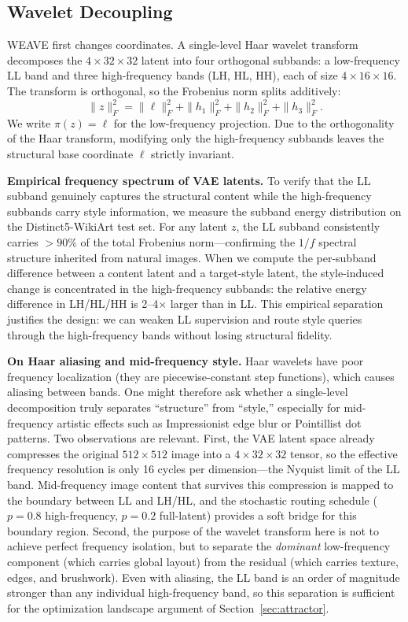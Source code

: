 \documentclass[letterpaper]{article}
\begin{document}
\subsection{Wavelet Decoupling}
\label{sec:fiberbundle}

WEAVE first changes coordinates.
A single-level Haar wavelet transform decomposes the $4{\times}32{\times}32$ latent into four orthogonal subbands: a low-frequency LL band and three high-frequency bands (LH, HL, HH), each of size $4{\times}16{\times}16$.
The transform is orthogonal, so the Frobenius norm splits additively:
\begin{equation}
\|z\|_F^2 = \|\ell\|_F^2 + \|h_1\|_F^2 + \|h_2\|_F^2 + \|h_3\|_F^2.
\end{equation}
We write $\pi(z)=\ell$ for the low-frequency projection.
Due to the orthogonality of the Haar transform, modifying only the high-frequency subbands leaves the structural base coordinate $\ell$ strictly invariant.

\textbf{Empirical frequency spectrum of VAE latents.}
To verify that the LL subband genuinely captures the structural content while the high-frequency subbands carry style information, we measure the subband energy distribution on the Distinct5-WikiArt test set.
For any latent $z$, the LL subband consistently carries $>\!90\%$ of the total Frobenius norm---confirming the $1/f$ spectral structure inherited from natural images.
When we compute the per-subband difference between a content latent and a target-style latent, the style-induced change is concentrated in the high-frequency subbands: the relative energy difference in LH/HL/HH is 2--4$\times$ larger than in LL.
This empirical separation justifies the design: we can weaken LL supervision and route style queries through the high-frequency bands without losing structural fidelity.

\textbf{On Haar aliasing and mid-frequency style.}
Haar wavelets have poor frequency localization (they are piecewise-constant step functions), which causes aliasing between bands.
One might therefore ask whether a single-level decomposition truly separates ``structure'' from ``style,'' especially for mid-frequency artistic effects such as Impressionist edge blur or Pointillist dot patterns.
Two observations are relevant.
First, the VAE latent space already compresses the original $512{\times}512$ image into a $4{\times}32{\times}32$ tensor, so the effective frequency resolution is only 16 cycles per dimension---the Nyquist limit of the LL band.
Mid-frequency image content that survives this compression is mapped to the boundary between LL and LH/HL, and the stochastic routing schedule ($p=0.8$ high-frequency, $p=0.2$ full-latent) provides a soft bridge for this boundary region.
Second, the purpose of the wavelet transform here is not to achieve perfect frequency isolation, but to separate the \emph{dominant} low-frequency component (which carries global layout) from the residual (which carries texture, edges, and brushwork).
Even with aliasing, the LL band is an order of magnitude stronger than any individual high-frequency band, so this separation is sufficient for the optimization landscape argument of Section~\ref{sec:attractor}.
\end{document}

